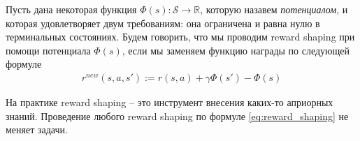 \documentclass[%
	11pt,
	a4paper,
	utf8,
		]{article}
\begin{document}
Пусть дана некоторая функция $ \Phi (s): \mathcal{S} \rightarrow \mathbb{R} $, которую назавем \emph{потенциалом}, и которая удовлетворяет двум требованиям: она ограничена и равна нулю в терминальных состояниях. Будем говорить, что мы проводим reward shaping при помощи потенциала $ \Phi(s) $, если мы заменяем функцию награды по следующей формуле
\begin{align}\label{eq:reward_shaping}
	r^{new}(s, a, s') := r(s,a) + \gamma \Phi (s') - \Phi(s)
\end{align}

На практике reward shaping -- это инструмент внесения каких-то априорных знаний. Проведение любого reward shaping по формуле \eqref{eq:reward_shaping} не меняет задачи.




\listoffigures{}

\begin{thebibliography}{99}
	
	
	
		
\end{thebibliography}
\end{document}
